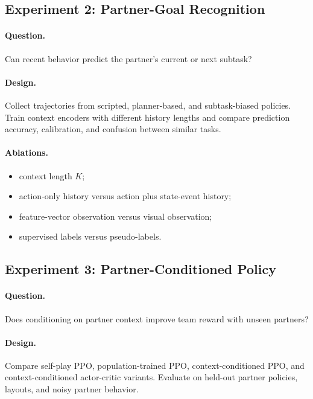 \documentclass[letterpaper]{article} %
\begin{document}
\subsection{Experiment 2: Partner-Goal Recognition}

\paragraph{Question.}
Can recent behavior predict the partner's current or next subtask?

\paragraph{Design.}
Collect trajectories from scripted, planner-based, and subtask-biased policies. Train context encoders with different history lengths and compare prediction accuracy, calibration, and confusion between similar tasks.

\paragraph{Ablations.}
\begin{itemize}
    \item context length $K$;
    \item action-only history versus action plus state-event history;
    \item feature-vector observation versus visual observation;
    \item supervised labels versus pseudo-labels.
\end{itemize}

\subsection{Experiment 3: Partner-Conditioned Policy}

\paragraph{Question.}
Does conditioning on partner context improve team reward with unseen partners?

\paragraph{Design.}
Compare self-play PPO, population-trained PPO, context-conditioned PPO, and context-conditioned actor-critic variants. Evaluate on held-out partner policies, layouts, and noisy partner behavior.
\end{document}
